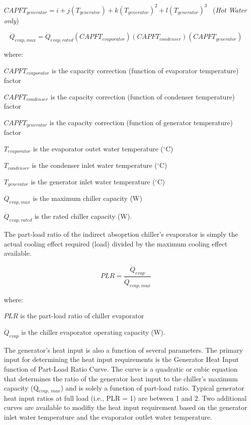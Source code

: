 \(CAPF{T_{generator}} = i + j\left( {{T_{generator}}} \right) + k{\left( {{T_{generator}}} \right)^2} + l{\left( {{T_{generator}}} \right)^3}\) ~(\emph{Hot Water only})

\begin{equation}
{\dot{Q}_{evap,max}} = {\dot{Q}_{evap,rated}}\left( {CAPF{T_{evaporator}}} \right)\left( {CAPF{T_{condenser}}} \right)\left( {CAPF{T_{generator}}} \right)
\end{equation}

where:

\(CAPF{T_{evaporator}}\) is the capacity correction (function of evaporator temperature) factor

\(CAPF{T_{condenser}}\) is the capacity correction (function of condenser temperature) factor

\(CAPF{T_{generator}}\) is the capacity correction (function of generator temperature) factor

\({T_{evaporator}}\) is the evaporator outet water temperature (\(^{\circ}\)C)

\({T_{condenser}}\) is the condenser inlet water temperature (\(^{\circ}\)C)

\({T_{generator}}\) is the generator inlet water temperature (\(^{\circ}\)C)

\({\dot Q_{evap,max}}\) is the maximum chiller capacity (W)

\({\dot Q_{evap,rated}}\) is the rated chiller capacity (W).

The part-load ratio of the indirect absoprtion chiller's evaporator is simply the actual cooling effect required (load) divided by the maximum cooling effect available.

\begin{equation}
  PLR = \frac{\dot{Q}_{evap}}{\dot{Q}_{evap,max}}
\end{equation}

where:

\(PLR\) is the part-load ratio of chiller evaporator

\({\dot Q_{evap}}\) is the chiller evaporator operating capacity (W).

The generator's heat input is also a function of several parameters. The primary input for determining the heat input requirements is the Generator Heat Input function of Part-Load Ratio Curve. The curve is a quadratic or cubic equation that determines the ratio of the generator heat input to the chiller's maximum capacity (Q\(_{evap,\, max}\)) and is solely a function of part-load ratio. Typical generator heat input ratios at full load (i.e., PLR = 1) are between 1 and 2. Two additional curves are available to modifiy the heat input requirement based on the generator inlet water temperature and the evaporator outlet water temperature.

